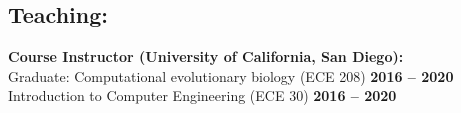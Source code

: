 \documentclass[margin,line,letterpaper]{resume}
\begin{document}
\begin{resume}



    \section{\mysidestyle Teaching:}

    \textbf{Course Instructor (University of California, San Diego):}\vspace{2mm}\\\vspace{1mm}%
     Graduate: Computational evolutionary biology (ECE 208)  \hfill \textbf{2016 -- 2020}\\
     Introduction to Computer Engineering  (ECE 30) \hfill \textbf{2016 -- 2020}


\end{resume}
\end{document}

